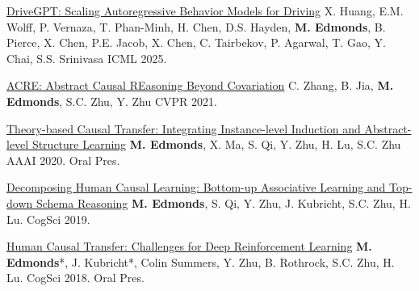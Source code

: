 


\begin{cvpublications}

\item \cvpublication
{\href{https://mjedmonds.com/papers/ICML25_DriveGPT.pdf}{DriveGPT: Scaling Autoregressive Behavior Models for Driving}} %
{X. Huang, E.M. Wolff, P. Vernaza, T. Phan-Minh, H. Chen, D.S. Hayden, \textbf{M. Edmonds}, B. Pierce, X. Chen, P.E. Jacob, X. Chen, C. Tairbekov, P. Agarwal, T. Gao, Y. Chai, S.S. Srinivasa} %
{ICML 2025.} %
{} %

\item \cvpublication
{\href{https://mjedmonds.com/papers/cvpr21zhang_acre.pdf}{ACRE: Abstract Causal REasoning Beyond Covariation}} %
{C. Zhang, B. Jia, \textbf{M. Edmonds}, S.C. Zhu, Y. Zhu} %
{CVPR 2021.} %
{} %

\item \cvpublication
{\href{https://mjedmonds.com/papers/AAAI20_OpenLockLearnerTransferRL_final.pdf}{Theory-based Causal Transfer: Integrating Instance-level Induction and Abstract-level Structure Learning}} %
{\textbf{M. Edmonds}, X. Ma, S. Qi, Y. Zhu, H. Lu, S.C. Zhu} %
{AAAI 2020.} %
{Oral Pres.} %

 \item \cvpublication
{\href{http://www.mjedmonds.com/papers/CogSci19_OpenLockLearner_final.pdf}{Decomposing Human Causal Learning: Bottom-up Associative Learning and Top-down Schema Reasoning}} %
{\textbf{M. Edmonds}, S. Qi, Y. Zhu,  J. Kubricht, S.C. Zhu, H. Lu.} %
{CogSci 2019.} %
{} %

\item \cvpublication
{\href{http://www.mjedmonds.com/papers/CogSci18_OpenLock_CausalRL_final.pdf}{Human Causal Transfer: Challenges for Deep Reinforcement Learning}} %
{\textbf{M. Edmonds}*, J. Kubricht*, Colin Summers, Y. Zhu, B. Rothrock, S.C. Zhu, H. Lu.} %
{CogSci 2018.} %
{Oral Pres.} %


\end{cvpublications}
